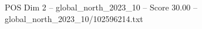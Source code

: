\begin{textsample}{POS Dim 2 – global\_north\_2023\_10 – Score 30.00 – global\_north\_2023\_10/102596214.txt}
\end{textsample}

